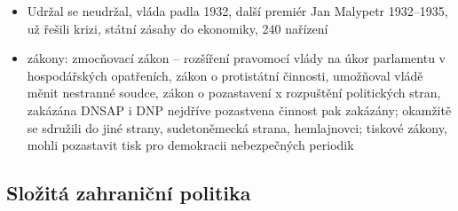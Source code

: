 \documentclass{article}
\begin{document}
\begin{itemize}
    \item Udržal se neudržal, vláda padla 1932, další premiér Jan Malypetr 1932--1935, už řešili krizi, státní zásahy do ekonomiky, 240 nařízení
    \item zákony: zmocňovací zákon -- rozšíření pravomocí vlády na úkor parlamentu v hospodářských opatřeních, zákon o protistátní činnosti, umožňoval vládě měnit nestranné soudce, zákon o pozastavení x rozpuštění politických stran, zakázána DNSAP i DNP nejdříve pozastvena činnost pak zakázány; okamžitě se sdružili do jiné strany, sudetoněmecká strana, hemlajnovci; tiskové zákony, mohli pozastavit tisk pro demokracii nebezpečných periodik
\end{itemize}

\subsection*{Složitá zahraniční politika}
\end{document}
